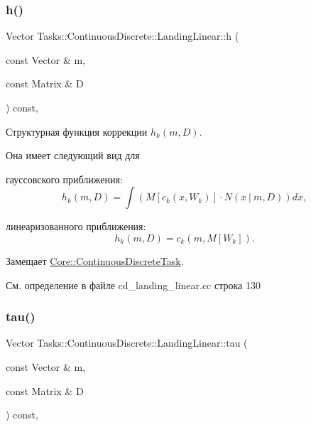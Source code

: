 \subsubsection{\texorpdfstring{h()}{h()}}
{\footnotesize\ttfamily Vector Tasks\+::\+Continuous\+Discrete\+::\+Landing\+Linear\+::h (\begin{DoxyParamCaption}\item[{const Vector \&}]{m,  }\item[{const Matrix \&}]{D }\end{DoxyParamCaption}) const\hspace{0.3cm}{\ttfamily [override]}, {\ttfamily [virtual]}}



Структурная функция коррекции $h_k(m, D)$. 

Она имеет следующий вид для


\begin{DoxyItemize}
\item гауссовского приближения\+: \[h_k(m, D) = \int (M[c_k(x, W_k)] \cdot N(x\ |\ m, D))dx,\]
\item линеаризованного приближения\+: \[h_k(m, D) = c_k(m, M[W_k]).\] 
\end{DoxyItemize}

Замещает \hyperlink{class_core_1_1_continuous_discrete_task_a25e88b71eb477d99bad66a66c982af6f}{Core\+::\+Continuous\+Discrete\+Task}.



См. определение в файле cd\+\_\+landing\+\_\+linear.\+cc строка 130

\hypertarget{class_tasks_1_1_continuous_discrete_1_1_landing_linear_a1ee11cced65180b2a055b8ca848ef4e0}{}\label{class_tasks_1_1_continuous_discrete_1_1_landing_linear_a1ee11cced65180b2a055b8ca848ef4e0} 
\subsubsection{\texorpdfstring{tau()}{tau()}}
{\footnotesize\ttfamily Vector Tasks\+::\+Continuous\+Discrete\+::\+Landing\+Linear\+::tau (\begin{DoxyParamCaption}\item[{const Vector \&}]{m,  }\item[{const Matrix \&}]{D }\end{DoxyParamCaption}) const\hspace{0.3cm}{\ttfamily [override]}, {\ttfamily [virtual]}}



